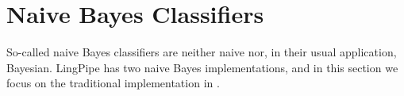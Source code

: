 \chapter{Naive Bayes Classifiers}\label{chap:naive-bayes}

So-called naive Bayes classifiers are neither naive nor, in their
usual application, Bayesian.  LingPipe has two naive Bayes
implementations, and in this section we focus on the traditional
implementation in .

